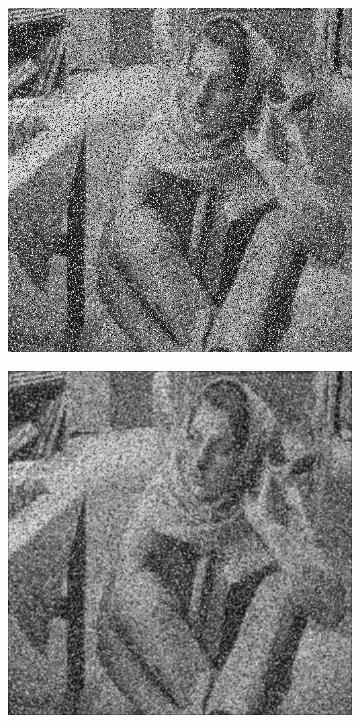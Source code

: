 \documentclass[12pt,a4paper]{report}
\begin{document}
\begin{figure}[!htb]
  \begin{minipage}{\linewidth}
    \centering
    \begin{subfigure}{0.49\textwidth}
      \includegraphics[width=\linewidth]{test_img/noise1.png}
    \end{subfigure}
    \begin{subfigure}{0.49\textwidth}
      \includegraphics[width=\linewidth]{output/noise1_q1_K3P1.png}
    \end{subfigure}


\end{minipage}
\end{figure}
\end{document}

